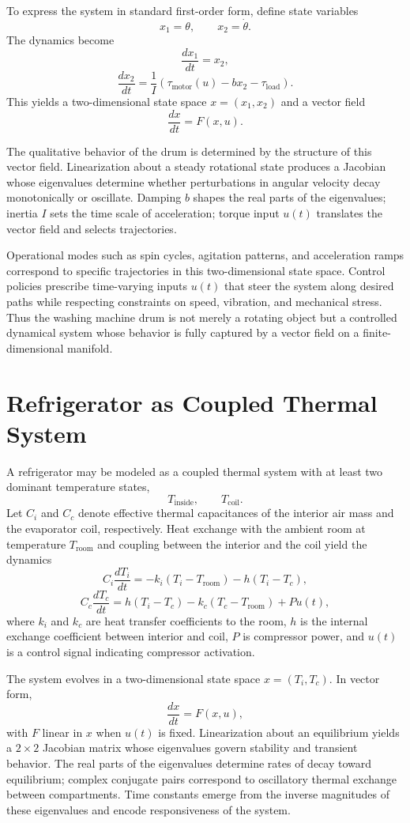 \documentclass[12pt]{book}
\begin{document}
To express the system in standard first-order form, define state
variables
\[
x_1 = \theta,
\qquad
x_2 = \dot{\theta}.
\]
The dynamics become
\[
\frac{dx_1}{dt} = x_2,
\]
\[
\frac{dx_2}{dt}
=
\frac{1}{I}
\left(
\tau_{\text{motor}}(u)
-
b x_2
-
\tau_{\text{load}}
\right).
\]
This yields a two-dimensional state space $x = (x_1, x_2)$ and a
vector field
\[
\frac{dx}{dt} = F(x,u).
\]

The qualitative behavior of the drum is determined by the structure of
this vector field. Linearization about a steady rotational state
produces a Jacobian whose eigenvalues determine whether perturbations
in angular velocity decay monotonically or oscillate. Damping $b$
shapes the real parts of the eigenvalues; inertia $I$ sets the time
scale of acceleration; torque input $u(t)$ translates the vector field
and selects trajectories.

Operational modes such as spin cycles, agitation patterns, and
acceleration ramps correspond to specific trajectories in this
two-dimensional state space. Control policies prescribe time-varying
inputs $u(t)$ that steer the system along desired paths while
respecting constraints on speed, vibration, and mechanical stress.
Thus the washing machine drum is not merely a rotating object but a
controlled dynamical system whose behavior is fully captured by a
vector field on a finite-dimensional manifold.

\section{Refrigerator as Coupled Thermal System}

A refrigerator may be modeled as a coupled thermal system with at least
two dominant temperature states,
\[
T_{\text{inside}}, \qquad T_{\text{coil}}.
\]
Let $C_i$ and $C_c$ denote effective thermal capacitances of the interior
air mass and the evaporator coil, respectively. Heat exchange with the
ambient room at temperature $T_{\text{room}}$ and coupling between the
interior and the coil yield the dynamics
\[
C_i \frac{dT_i}{dt}
=
- k_i (T_i - T_{\text{room}})
-
h (T_i - T_c),
\]
\[
C_c \frac{dT_c}{dt}
=
h (T_i - T_c)
-
k_c (T_c - T_{\text{room}})
+
P u(t),
\]
where $k_i$ and $k_c$ are heat transfer coefficients to the room,
$h$ is the internal exchange coefficient between interior and coil,
$P$ is compressor power, and $u(t)$ is a control signal indicating
compressor activation.

The system evolves in a two-dimensional state space
$x = (T_i, T_c)$. In vector form,
\[
\frac{dx}{dt} = F(x,u),
\]
with $F$ linear in $x$ when $u(t)$ is fixed. Linearization about an
equilibrium yields a $2 \times 2$ Jacobian matrix whose eigenvalues
govern stability and transient behavior. The real parts of the
eigenvalues determine rates of decay toward equilibrium; complex
conjugate pairs correspond to oscillatory thermal exchange between
compartments. Time constants emerge from the inverse magnitudes of
these eigenvalues and encode responsiveness of the system.
\end{document}
